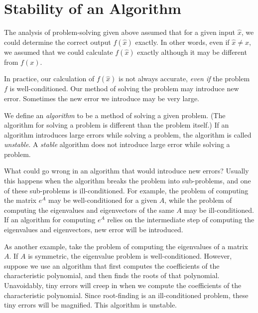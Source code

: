 \section*{Stability of an Algorithm}

The analysis of problem-solving given above assumed that for a given input $\hat{x}$, we could determine the correct output $f(\hat{x})$ exactly. In other words, even if $\hat{x} \neq x$, we assumed that we could calculate $f(\hat{x})$ exactly although it may be different from $f(x)$. 

In practice, our calculation of $f(\hat{x})$ is not always accurate, \emph{even if} the problem $f$ is well-conditioned. Our method of solving the problem may introduce new error. Sometimes the new error we introduce may be very large. 

We define an \emph{algorithm} to be a method of solving a given problem. (The algorithm for solving a problem is different than the problem itself.) If an algorithm introduces large errors while solving a problem, the algorithm is called \emph{unstable}. A \emph{stable} algorithm does not introduce large error while solving a problem.

What could go wrong in an algorithm that would introduce new errors? Usually this happens when the algorithm breaks the problem into sub-problems, and one of these sub-problems is ill-conditioned. For example, the problem of computing the matrix $e^A$ may be well-conditioned for a given $A$, while the problem of computing the eigenvalues and eigenvectors of the same $A$ may be ill-conditioned. If an algorithm for computing $e^A$ relies on the intermediate step of computing the eigenvalues and eigenvectors, new error will be introduced. 

As another example, take the problem of computing the eigenvalues of a matrix $A$. If $A$ is symmetric, the eigenvalue problem is well-conditioned. However, suppose we use an algorithm that first computes the coefficients of the characteristic polynomial, and then finds the roots of that polynomial. Unavoidably, tiny errors will creep in when we compute the coefficients of the characteristic polynomial. Since root-finding is an ill-conditioned problem, these tiny errors will be magnified. This algorithm is unstable.

